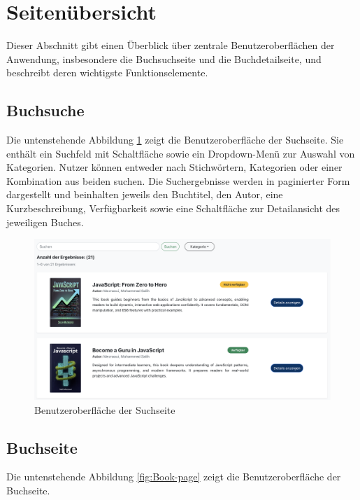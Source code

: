 \section{Seitenübersicht}
Dieser Abschnitt gibt einen Überblick über zentrale Benutzeroberflächen der Anwendung, insbesondere die Buchsuchseite und die Buchdetailseite, und beschreibt deren wichtigste Funktionselemente.

\subsection{Buchsuche}

Die untenstehende Abbildung \ref{fig:Search-page} zeigt die Benutzeroberfläche der Suchseite. Sie enthält ein Suchfeld mit Schaltfläche sowie ein Dropdown-Menü zur Auswahl von Kategorien. Nutzer können entweder nach Stichwörtern, Kategorien oder einer Kombination aus beiden suchen. Die Suchergebnisse werden in paginierter Form dargestellt und beinhalten jeweils den Buchtitel, den Autor, eine Kurzbeschreibung, Verfügbarkeit sowie eine Schaltfläche zur Detailansicht des jeweiligen Buches.

\begin{figure}[H]
	\centering
	\includegraphics[width=1.0\textwidth]{images/UI-screenshots/Search-page.png}%
	\caption{Benutzeroberfläche der Suchseite}
	\label{fig:Search-page}
\end{figure}

\subsection{Buchseite}
Die untenstehende Abbildung  \ref{fig:Book-page} zeigt die Benutzeroberfläche der Buchseite. 

